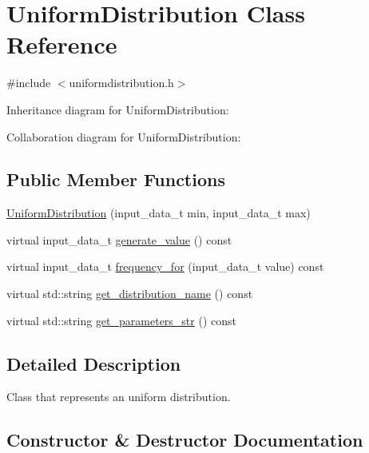 \hypertarget{classUniformDistribution}{}\section{Uniform\+Distribution Class Reference}
\label{classUniformDistribution}


{\ttfamily \#include $<$uniformdistribution.\+h$>$}



Inheritance diagram for Uniform\+Distribution\+:


Collaboration diagram for Uniform\+Distribution\+:
\subsection*{Public Member Functions}
\begin{DoxyCompactItemize}
\item 
\hyperlink{classUniformDistribution_a9f5f6a4b36365d61a012de6bd9ee08f8}{Uniform\+Distribution} (input\+\_\+data\+\_\+t min, input\+\_\+data\+\_\+t max)
\item 
virtual input\+\_\+data\+\_\+t \hyperlink{classUniformDistribution_a3a5482105f2b3cabc7a2cc33ce27c1ea}{generate\+\_\+value} () const
\item 
virtual input\+\_\+data\+\_\+t \hyperlink{classUniformDistribution_a3bf3390b5717b5958e36726b12aa953b}{frequency\+\_\+for} (input\+\_\+data\+\_\+t value) const
\item 
virtual std\+::string \hyperlink{classUniformDistribution_a41a9a47839d15e67d5e2432f983ed382}{get\+\_\+distribution\+\_\+name} () const
\item 
virtual std\+::string \hyperlink{classUniformDistribution_a9e276cfa4ff3021a0e4b1b4edd8a1c67}{get\+\_\+parameters\+\_\+str} () const
\end{DoxyCompactItemize}


\subsection{Detailed Description}
Class that represents an uniform distribution. 

\subsection{Constructor \& Destructor Documentation}
\mbox{\label{classUniformDistribution_a9f5f6a4b36365d61a012de6bd9ee08f8}} 

